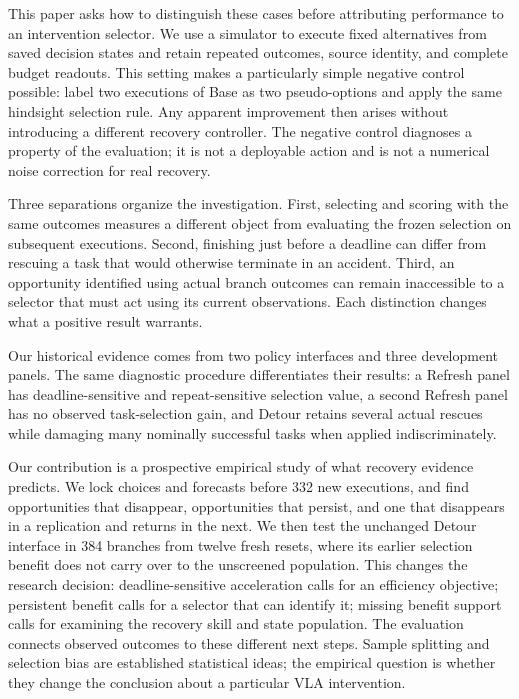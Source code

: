 This paper asks how to distinguish these cases before attributing performance to an intervention selector. We use a simulator to execute fixed alternatives from saved decision states and retain repeated outcomes, source identity, and complete budget readouts. This setting makes a particularly simple negative control possible: label two executions of Base as two pseudo-options and apply the same hindsight selection rule. Any apparent improvement then arises without introducing a different recovery controller. The negative control diagnoses a property of the evaluation; it is not a deployable action and is not a numerical noise correction for real recovery.


Three separations organize the investigation. First, selecting and scoring with the same outcomes measures a different object from evaluating the frozen selection on subsequent executions. Second, finishing just before a deadline can differ from rescuing a task that would otherwise terminate in an accident. Third, an opportunity identified using actual branch outcomes can remain inaccessible to a selector that must act using its current observations. Each distinction changes what a positive result warrants.


Our historical evidence comes from two policy interfaces and three development panels. The same diagnostic procedure differentiates their results: a Refresh panel has deadline-sensitive and repeat-sensitive selection value, a second Refresh panel has no observed task-selection gain, and Detour retains several actual rescues while damaging many nominally successful tasks when applied indiscriminately.


Our contribution is a prospective empirical study of what recovery evidence predicts. We lock choices and forecasts before 332 new executions, and find opportunities that disappear, opportunities that persist, and one that disappears in a replication and returns in the next. We then test the unchanged Detour interface in 384 branches from twelve fresh resets, where its earlier selection benefit does not carry over to the unscreened population. This changes the research decision: deadline-sensitive acceleration calls for an efficiency objective; persistent benefit calls for a selector that can identify it; missing benefit support calls for examining the recovery skill and state population. The evaluation connects observed outcomes to these different next steps. Sample splitting and selection bias are established statistical ideas; the empirical question is whether they change the conclusion about a particular VLA intervention.


